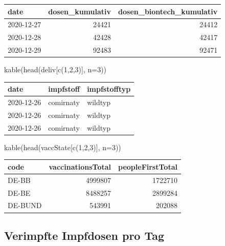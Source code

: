 \documentclass[
]{article}
\newenvironment{Shaded}{\begin{snugshade}}{\end{snugshade}}
\newcommand{\AttributeTok}[1]{\textcolor[rgb]{0.77,0.63,0.00}{#1}}
\newcommand{\DecValTok}[1]{\textcolor[rgb]{0.00,0.00,0.81}{#1}}
\newcommand{\FunctionTok}[1]{\textcolor[rgb]{0.00,0.00,0.00}{#1}}
\newcommand{\NormalTok}[1]{#1}
\begin{document}
\begin{longtable}[]{@{}lrr@{}}
\toprule()
date & dosen\_kumulativ & dosen\_biontech\_kumulativ \\
\midrule()
\endhead
2020-12-27 & 24421 & 24412 \\
2020-12-28 & 42428 & 42417 \\
2020-12-29 & 92483 & 92471 \\
\bottomrule()
\end{longtable}

\begin{Shaded}
\begin{Highlighting}[]
\FunctionTok{kable}\NormalTok{(}\FunctionTok{head}\NormalTok{(deliv[}\FunctionTok{c}\NormalTok{(}\DecValTok{1}\NormalTok{,}\DecValTok{2}\NormalTok{,}\DecValTok{3}\NormalTok{)], }\AttributeTok{n=}\DecValTok{3}\NormalTok{))}
\end{Highlighting}
\end{Shaded}

\begin{longtable}[]{@{}lll@{}}
\toprule()
date & impfstoff & impfstofftyp \\
\midrule()
\endhead
2020-12-26 & comirnaty & wildtyp \\
2020-12-26 & comirnaty & wildtyp \\
2020-12-26 & comirnaty & wildtyp \\
\bottomrule()
\end{longtable}

\begin{Shaded}
\begin{Highlighting}[]
\FunctionTok{kable}\NormalTok{(}\FunctionTok{head}\NormalTok{(vaccState[}\FunctionTok{c}\NormalTok{(}\DecValTok{1}\NormalTok{,}\DecValTok{2}\NormalTok{,}\DecValTok{3}\NormalTok{)], }\AttributeTok{n=}\DecValTok{3}\NormalTok{))}
\end{Highlighting}
\end{Shaded}

\begin{longtable}[]{@{}lrr@{}}
\toprule()
code & vaccinationsTotal & peopleFirstTotal \\
\midrule()
\endhead
DE-BB & 4999807 & 1722710 \\
DE-BE & 8488257 & 2899284 \\
DE-BUND & 543991 & 202088 \\
\bottomrule()
\end{longtable}

\hypertarget{verimpfte-impfdosen-pro-tag}{%
\subsection{Verimpfte Impfdosen pro
Tag}\label{verimpfte-impfdosen-pro-tag}}
\end{document}
